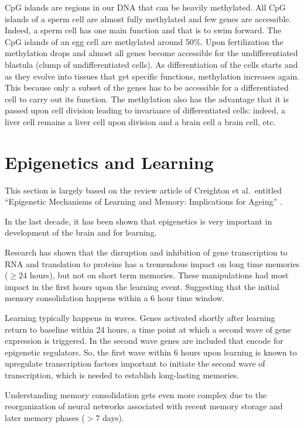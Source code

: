\documentclass[
  11pt,
]{book}
\begin{document}
CpG islands are regions in our DNA that can be heavily methylated. All CpG islands of a sperm cell are almost fully methylated and few genes are accessible. Indeed, a sperm cell has one main function and that is to swim forward. The CpG islands of an egg cell are methylated around 50\%. Upon fertilization the methylation drops and almost all genes become accessible for the undifferentiated blastula (clump of undifferentiated cells). As differentiation of the cells starts and as they evolve into tissues that get specific functions, methylation increases again. This because only a subset of the genes has to be accessible for a differentiated cell to carry out its function. The methylation also has the advantage that it is passed upon cell division leading to invariance of differentiated cells: indeed, a liver cell remains a liver cell upon division and a brain cell a brain cell, etc.

\hypertarget{epigenetics-and-learning}{%
\section{Epigenetics and Learning}\label{epigenetics-and-learning}}

This section is largely based on the review article of Creighton et al.~entitled ``Epigenetic Mechanisms of Learning and Memory: Implications for Ageing'' \citep{Creighton2020}.

In the last decade, it has been shown that epigenetics is very important in development of the brain and for learning.

Research has shown that the disruption and inhibition of gene transcription to RNA and translation to proteins has a tremendous impact on long time memories (\(\geq 24\) hours), but not on short term memories. These manipulations had most impact in the first hours upon the learning event. Suggesting that the initial memory consolidation happens within a 6 hour time window.

Learning typically happens in waves. Genes activated shortly after learning return to baseline within 24 hours, a time point at which a second wave of gene expression is triggered.
In the second wave genes are included that encode for epigenetic regulators.
So, the first wave within 6 hours upon learning is known to upregulate transcription factors important to initiate the second wave of transcription, which is needed to establish long-lasting memories.

Understanding memory consolidation gets even more complex due to the reorganization of neural networks associated with recent memory storage and later memory phases (\(>7\) days).
\end{document}
